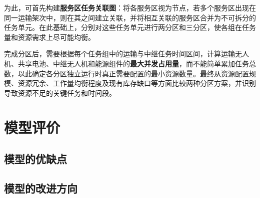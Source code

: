 \documentclass[bwprint,fontset=fandol]{gmcmthesis}
\begin{document}
为此，可首先构建\textbf{服务区任务关联图}：将各服务区视为节点，若多个服务区出现在同一运输架次中，则在其之间建立关联，并将相互关联的服务区合并为不可拆分的任务单元。在此基础上，分别对这些任务单元进行两分区和三分区，使各组在任务量和资源需求上尽可能均衡。

完成分区后，需要根据每个任务组中的运输与中继任务时间区间，计算运输无人机、共享电池、中继无人机和能源组件的\textbf{最大并发占用量}，而不能简单累加任务总数，以此确定各分区独立运行时真正需要配置的最小资源数量。最终从资源配置规模、资源冗余、工作量均衡程度及现有库存缺口等方面比较两种分区方案，并识别导致资源不足的关键任务和时间段。

\section{模型评价}
\subsection{模型的优缺点}
\subsection{模型的改进方向}



\cite{mittelbach_latex_2004,wright_latex3_2009,beeton_unicode_2008,vieth_experiences_2009}



\end{document}
